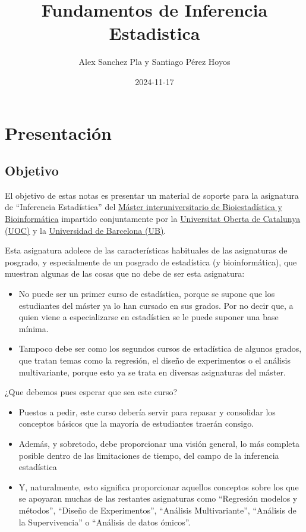 \documentclass[
]{article}
\title{Fundamentos de Inferencia Estadistica}
\author{Alex Sanchez Pla y Santiago Pérez Hoyos}
\date{2024-11-17}
\providecommand{\tightlist}{%
  \setlength{\itemsep}{0pt}\setlength{\parskip}{0pt}}
\begin{document}
\maketitle

{
\setcounter{tocdepth}{2}
\tableofcontents
}
\section*{Presentación}\label{presentaciuxf3n}

\subsection*{Objetivo}\label{objetivo}

El objetivo de estas notas es presentar un material de soporte para la asignatura de ``Inferencia Estadística'' del \href{https://www.uoc.edu/es/estudios/masters/master-universitario-bioinformatica-bioestadistica}{Máster interuniversitario de Bioiestadística y Bioinformática} impartido conjuntamente por la \href{https://www.uoc.edu}{Universitat Oberta de Catalunya (UOC)} y la \href{https://www.ub.edu}{Universidad de Barcelona (UB)}.

Esta asignatura adolece de las características habituales de las asignaturas de posgrado, y especialmente de un posgrado de estadística (y bioinformática), que muestran algunas de las cosas que no debe de ser esta asignatura:

\begin{itemize}
\tightlist
\item
  No puede ser un primer curso de estadística, porque se supone que los estudiantes del máster ya lo han cursado en sus grados. Por no decir que, a quien viene a especializarse en estadística se le puede suponer una base mínima.
\item
  Tampoco debe ser como los segundos cursos de estadística de algunos grados, que tratan temas como la regresión, el diseño de experimentos o el análisis multivariante, porque esto ya se trata en diversas asignaturas del máster.
\end{itemize}

¿Que debemos pues esperar que sea este curso?

\begin{itemize}
\tightlist
\item
  Puestos a pedir, este curso debería servir para repasar y consolidar los conceptos básicos que la mayoría de estudiantes traerán consigo.
\item
  Además, y sobretodo, debe proporcionar una visión general, lo más completa posible dentro de las limitaciones de tiempo, del campo de la inferencia estadística
\item
  Y, naturalmente, esto significa proporcionar aquellos conceptos sobre los que se apoyaran muchas de las restantes asignaturas como ``Regresión modelos y métodos'', ``Diseño de Experimentos'', ``Análisis Multivariante'', ``Análisis de la Supervivencia'' o ``Análisis de datos ómicos''.
\end{itemize}
\end{document}
